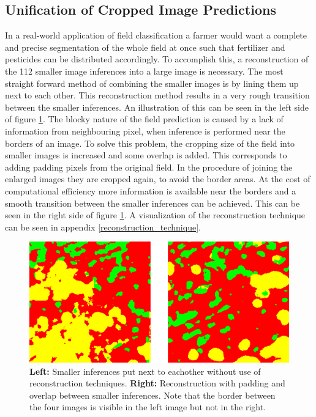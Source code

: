 \documentclass{article}
\begin{document}
\subsection{Unification of Cropped Image Predictions}
In a real-world application of field classification a farmer would want a complete and precise segmentation of the whole field at once such that fertilizer and pesticides can be distributed accordingly.
To accomplish this, a reconstruction of the 112 smaller image inferences into a large image is necessary.
The most straight forward method of combining the smaller images is by lining them up next to each other.
This reconstruction method results in a very rough transition between the smaller inferences. An illustration of this can be seen in the left side of figure \ref{fig:earlylatereconstruction}.
The blocky nature of the field prediction is caused by a lack of information from neighbouring pixel, when inference is performed near the borders of an image. 
To solve this problem, the cropping size of the field into smaller images is increased and some overlap is added. This corresponds to adding padding pixels from the original field.
In the procedure of joining the enlarged images they are cropped again, to avoid the border areas. At the cost of computational efficiency more information is available near the borders and a smooth transition between the smaller inferences can be achieved. This can be seen in the right side of figure \ref{fig:earlylatereconstruction}. A visualization of the reconstruction technique can be seen in appendix \ref{reconstruction_technique}.



\begin{figure}[!htb]
	\centering
	\includegraphics[width=0.9\linewidth]{early_late_reconstruction2}
	\caption{\textbf{Left:} Smaller inferences put next to eachother without use of reconstruction techniques. \textbf{Right:} Reconstruction with padding and overlap between smaller inferences. Note that the border between the four images is visible in the left image but not in the right.}
	\label{fig:earlylatereconstruction}
\end{figure}
\end{document}
